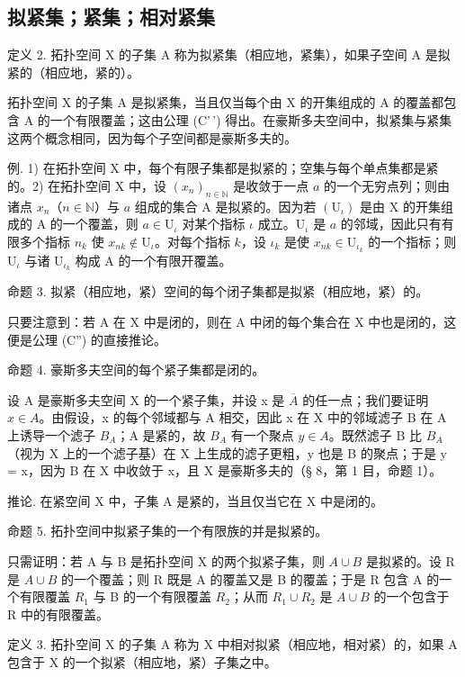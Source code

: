 \subsection{拟紧集；紧集；相对紧集}

定义 2. 拓扑空间 X 的子集 A 称为拟紧集（相应地，紧集），如果子空间 A 是拟紧的（相应地，紧的）。

拓扑空间 X 的子集 A 是拟紧集，当且仅当每个由 X 的开集组成的 A 的覆盖都包含 A 的一个有限覆盖；这由公理 (C'\,') 得出。在豪斯多夫空间中，拟紧集与紧集这两个概念相同，因为每个子空间都是豪斯多夫的。

例. 1) 在拓扑空间 X 中，每个有限子集都是拟紧的；空集与每个单点集都是紧的。2) 在拓扑空间 X 中，设 \((x_{n})_{n\in \mathbb{N}}\) 是收敛于一点 \(a\) 的一个无穷点列；则由诸点 \(x_{n}\)（\(n\in \mathbb{N}\)）与 \(a\) 组成的集合 A 是拟紧的。因为若 \((\mathrm{U}_{\iota})\) 是由 X 的开集组成的 A 的一个覆盖，则 \(a\in \mathrm{U}_{\iota}\) 对某个指标 \(\iota\) 成立。\(\mathrm{U}_{\iota}\) 是 \(a\) 的邻域，因此只有有限多个指标 \(n_k\) 使 \(x_{nk}\notin \mathrm{U}_{\iota}\)。对每个指标 \(k\)，设 \(\iota_{k}\) 是使 \(x_{nk}\in \mathrm{U}_{\iota_{k}}\) 的一个指标；则 \(\mathrm{U}_{\iota}\) 与诸 \(\mathrm{U}_{\iota_{k}}\) 构成 A 的一个有限开覆盖。

命题 3. 拟紧（相应地，紧）空间的每个闭子集都是拟紧（相应地，紧）的。

只要注意到：若 A 在 X 中是闭的，则在 A 中闭的每个集合在 X 中也是闭的，这便是公理 (C'') 的直接推论。

命题 4. 豪斯多夫空间的每个紧子集都是闭的。

设 A 是豪斯多夫空间 X 的一个紧子集，并设 x 是 \(\overline{A}\) 的任一点；我们要证明 \(x \in A\)。由假设，x 的每个邻域都与 A 相交，因此 x 在 X 中的邻域滤子 B 在 A 上诱导一个滤子 \(B_{A}\)；A 是紧的，故 \(B_{A}\) 有一个聚点 \(y \in A\)。既然滤子 B 比 \(B_{A}\)（视为 X 上的一个滤子基）在 X 上生成的滤子更粗，y 也是 B 的聚点；于是 y = x，因为 B 在 X 中收敛于 x，且 X 是豪斯多夫的（§ 8，第 1 目，命题 1）。

推论. 在紧空间 X 中，子集 A 是紧的，当且仅当它在 X 中是闭的。

命题 5. 拓扑空间中拟紧子集的一个有限族的并是拟紧的。

只需证明：若 A 与 B 是拓扑空间 X 的两个拟紧子集，则 \(A \cup B\) 是拟紧的。设 R 是 \(A \cup B\) 的一个覆盖；则 R 既是 A 的覆盖又是 B 的覆盖；于是 R 包含 A 的一个有限覆盖 \(R_{1}\) 与 B 的一个有限覆盖 \(R_{2}\)；从而 \(R_{1} \cup R_{2}\) 是 \(A \cup B\) 的一个包含于 R 中的有限覆盖。

定义 3. 拓扑空间 X 的子集 A 称为 X 中相对拟紧（相应地，相对紧）的，如果 A 包含于 X 的一个拟紧（相应地，紧）子集之中。

